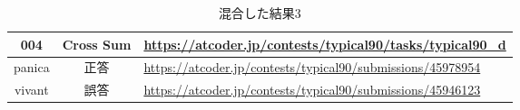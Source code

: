 \begin{table}[h]
    \centering
    \caption{混合した結果3}
    \label{tab:4}
    \begin{adjustbox}{center}
    \begin{tabular}{|c|c|p{10cm}|}%
        \hline
        004 & Cross Sum & \url{https://atcoder.jp/contests/typical90/tasks/typical90_d} \\ \hline
       panica &正答 
                
        & \url{https://atcoder.jp/contests/typical90/submissions/45978954} \\ \hline
        vivant &誤答 
        & \url{https://atcoder.jp/contests/typical90/submissions/45946123} \\ \hline
    \end{tabular}
    \end{adjustbox}
\end{table}


